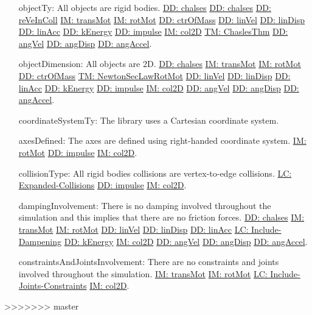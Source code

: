 \documentclass[12pt]{article}
\begin{document}
\begin{itemize}
\item[objectTy:\phantomsection\label{assumpOT}]All objects are rigid bodies. \hyperref[DD:chalses]{DD: chalses} \hyperref[DD:chalses]{DD: chalses} \hyperref[DD:reVeInColl]{DD: reVeInColl} \hyperref[IM:transMot]{IM: transMot} \hyperref[IM:rotMot]{IM: rotMot} \hyperref[DD:ctrOfMass]{DD: ctrOfMass} \hyperref[DD:linVel]{DD: linVel} \hyperref[DD:linDisp]{DD: linDisp} \hyperref[DD:linAcc]{DD: linAcc} \hyperref[DD:kEnergy]{DD: kEnergy} \hyperref[DD:impulse]{DD: impulse} \hyperref[IM:col2D]{IM: col2D} \hyperref[TM:ChaslesThm]{TM: ChaslesThm} \hyperref[DD:angVel]{DD: angVel} \hyperref[DD:angDisp]{DD: angDisp} \hyperref[DD:angAccel]{DD: angAccel}.
\item[objectDimension:\phantomsection\label{assumpOD}]All objects are 2D. \hyperref[DD:chalses]{DD: chalses} \hyperref[IM:transMot]{IM: transMot} \hyperref[IM:rotMot]{IM: rotMot} \hyperref[DD:ctrOfMass]{DD: ctrOfMass} \hyperref[TM:NewtonSecLawRotMot]{TM: NewtonSecLawRotMot} \hyperref[DD:linVel]{DD: linVel} \hyperref[DD:linDisp]{DD: linDisp} \hyperref[DD:linAcc]{DD: linAcc} \hyperref[DD:kEnergy]{DD: kEnergy} \hyperref[DD:impulse]{DD: impulse} \hyperref[IM:col2D]{IM: col2D} \hyperref[DD:angVel]{DD: angVel} \hyperref[DD:angDisp]{DD: angDisp} \hyperref[DD:angAccel]{DD: angAccel}.
\item[coordinateSystemTy:\phantomsection\label{assumpCST}]The library uses a Cartesian coordinate system.
\item[axesDefined:\phantomsection\label{assumpAD}]The axes are defined using right-handed coordinate system. \hyperref[IM:rotMot]{IM: rotMot} \hyperref[DD:impulse]{DD: impulse} \hyperref[IM:col2D]{IM: col2D}.
\item[collisionType:\phantomsection\label{assumpCT}]All rigid bodies collisions are vertex-to-edge collisions. \hyperref[lcEC]{LC: Expanded-Collisions} \hyperref[DD:impulse]{DD: impulse} \hyperref[IM:col2D]{IM: col2D}.
\item[dampingInvolvement:\phantomsection\label{assumpDI}]There is no damping involved throughout the simulation and this implies that there are no friction forces. \hyperref[DD:chalses]{DD: chalses} \hyperref[IM:transMot]{IM: transMot} \hyperref[IM:rotMot]{IM: rotMot} \hyperref[DD:linVel]{DD: linVel} \hyperref[DD:linDisp]{DD: linDisp} \hyperref[DD:linAcc]{DD: linAcc} \hyperref[lcID]{LC: Include-Dampening} \hyperref[DD:kEnergy]{DD: kEnergy} \hyperref[IM:col2D]{IM: col2D} \hyperref[DD:angVel]{DD: angVel} \hyperref[DD:angDisp]{DD: angDisp} \hyperref[DD:angAccel]{DD: angAccel}.
\item[constraintsAndJointsInvolvement:\phantomsection\label{assumpCAJI}]There are no constraints and joints involved throughout the simulation. \hyperref[IM:transMot]{IM: transMot} \hyperref[IM:rotMot]{IM: rotMot} \hyperref[lcIJC]{LC: Include-Joints-Constraints} \hyperref[IM:col2D]{IM: col2D}.
\end{itemize}
>>>>>>> master
\end{document}
